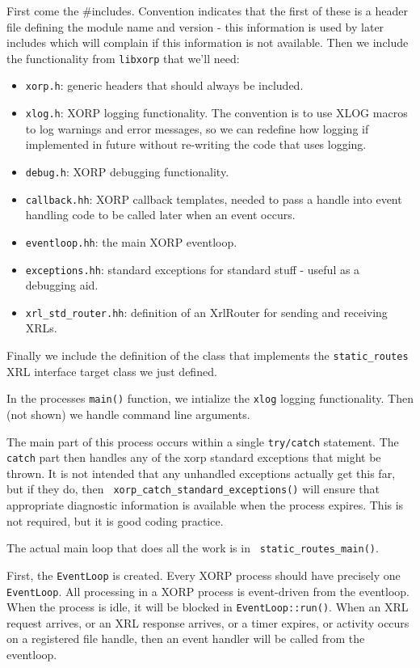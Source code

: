 \documentclass[11pt]{article}
\newcommand{\stt}{\tt\small}
\newcommand{\SR}{{\tt\small static\_routes}\xspace}
\begin{document}
First come the \#includes. Convention indicates that the first
of these is a header file defining the module name and version - this
information is used by later includes which will complain if this
information is not available.  Then we include the functionality from
{\stt libxorp} that we'll need:
\begin{itemize}
\item {\stt xorp.h}: generic headers that should always be included.
\item {\stt xlog.h}: XORP logging functionality.  The convention is to
  use XLOG macros to log warnings and error messages, so we can
  redefine how logging if implemented in future without re-writing
  the code that uses logging.  
\item {\stt debug.h}: XORP debugging functionality.
\item {\stt callback.hh}: XORP callback templates, needed to pass a
  handle into event handling code to be called later when an event
  occurs.
\item {\stt eventloop.hh}: the main XORP eventloop.
\item {\stt exceptions.hh}: standard exceptions for standard stuff -
  useful as a debugging aid.
\item {\stt xrl\_std\_router.hh}: definition of an XrlRouter for sending
  and receiving XRLs.
\end{itemize}
Finally we include the definition of the class that implements the \SR
XRL interface target class we just defined.

In the processes {\stt main()} function, we intialize the {\stt xlog}
logging functionality.  Then (not shown) we handle command line
arguments.  

The main part of this process occurs within a single {\stt try/catch}
statement.  The {\stt catch} part then handles any of the xorp standard
exceptions that might be thrown.  It is not intended that any
unhandled exceptions actually get this far, but if they do, then {\stt
xorp\_catch\_standard\_exceptions()} will ensure that appropriate
diagnostic information is available when the process expires.  This is
not required, but it is good coding practice.

The actual main loop that does all the work is in {\stt
static\_routes\_main()}.

First, the {\tt EventLoop} is created.  Every XORP process should have
precisely one {\tt EventLoop}.  All processing in a XORP process is
event-driven from the eventloop.  When the process is idle, it will be
blocked in {\stt EventLoop::run()}.  When an XRL request arrives, or
an XRL response arrives, or a timer expires, or activity occurs on a
registered file handle, then an event handler will be called from the
eventloop.
\end{document}
